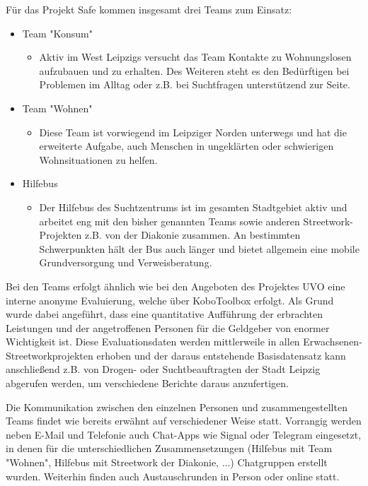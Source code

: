 Für das Projekt \ac{Safe} kommen insgesamt drei Teams zum Einsatz:
\begin{itemize}
	\item Team "Konsum"
	\begin{itemize}
		\item[] Aktiv im West Leipzigs versucht das Team Kontakte zu Wohnungslosen aufzubauen und zu erhalten. Des Weiteren steht es den Bedürftigen bei Problemen im Alltag oder z.B. bei Suchtfragen unterstützend zur Seite.
	\end{itemize}
	\item Team "Wohnen"
	\begin{itemize}
		\item[] Diese Team ist vorwiegend im Leipziger Norden unterwegs und hat die erweiterte Aufgabe, auch Menschen in ungeklärten oder schwierigen Wohnsituationen zu helfen.
	\end{itemize}
	\item Hilfebus
	\begin{itemize}
		\item[] Der Hilfebus des Suchtzentrums ist im gesamten Stadtgebiet aktiv und arbeitet eng mit den bisher genannten Teams sowie anderen Streetwork-Projekten z.B. von der Diakonie zusammen. An bestimmten Schwerpunkten hält der Bus auch länger und bietet allgemein eine mobile Grundversorgung und Verweisberatung.
	\end{itemize}
\end{itemize}

Bei den Teams erfolgt ähnlich wie bei den Angeboten des Projektes \ac{UVO} eine interne anonyme Evaluierung, welche über KoboToolbox erfolgt. Als Grund wurde dabei angeführt, dass eine quantitative Aufführung der erbrachten Leistungen und der angetroffenen Personen für die Geldgeber von enormer Wichtigkeit ist. Diese Evaluationsdaten werden mittlerweile in allen Erwachsenen-Streetworkprojekten erhoben und der daraus entstehende Basisdatensatz kann anschließend z.B. von Drogen- oder Suchtbeauftragten der Stadt Leipzig abgerufen werden, um verschiedene Berichte daraus anzufertigen.

Die Kommunikation zwischen den einzelnen Personen und zusammengestellten Teams findet wie bereits erwähnt auf verschiedener Weise statt. Vorrangig werden neben E-Mail und Telefonie auch Chat-Apps wie Signal oder Telegram eingesetzt, in denen für die unterschiedlichen Zusammensetzungen (Hilfebus mit Team "Wohnen", Hilfebus mit Streetwork der Diakonie, ...) Chatgruppen erstellt wurden. Weiterhin finden auch Austauschrunden in Person oder online statt.

